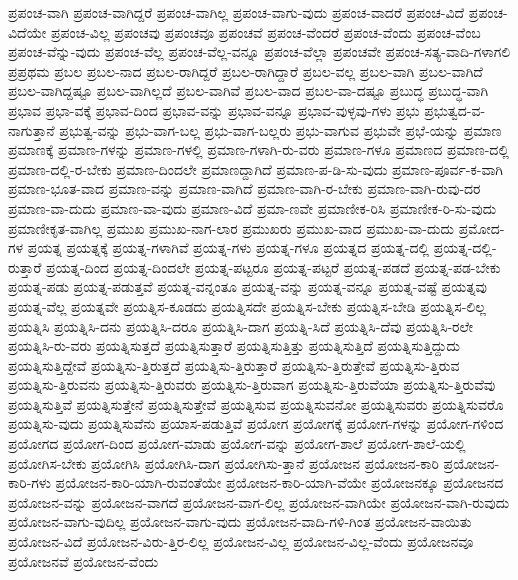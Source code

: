 {ಪ್ರಪಂಚ-ವಾಗಿ
ಪ್ರಪಂಚ-ವಾಗಿದ್ದರೆ
ಪ್ರಪಂಚ-ವಾಗಿಲ್ಲ
ಪ್ರಪಂಚ-ವಾಗು-ವುದು
ಪ್ರಪಂಚ-ವಾದರೆ
ಪ್ರಪಂಚ-ವಿದೆ
ಪ್ರಪಂಚ-ವಿದೆಯೇ
ಪ್ರಪಂಚ-ವಿಲ್ಲ
ಪ್ರಪಂಚವು
ಪ್ರಪಂಚವೂ
ಪ್ರಪಂಚವೆ
ಪ್ರಪಂಚ-ವೆಂದರೆ
ಪ್ರಪಂಚ-ವೆಂದು
ಪ್ರಪಂಚ-ವೆಂಬ
ಪ್ರಪಂಚ-ವೆನ್ನು-ವುದು
ಪ್ರಪಂಚ-ವೆಲ್ಲ
ಪ್ರಪಂಚ-ವೆಲ್ಲ-ವನ್ನೂ
ಪ್ರಪಂಚ-ವೆಲ್ಲಾ
ಪ್ರಪಂಚವೇ
ಪ್ರಪಂಚ-ಸತ್ಯ-ವಾದಿ-ಗಳಾಗಲಿ
ಪ್ರಪ್ರಥಮ
ಪ್ರಬಲ
ಪ್ರಬಲ-ನಾದ
ಪ್ರಬಲ-ರಾಗಿದ್ದರೆ
ಪ್ರಬಲ-ರಾಗಿದ್ದಾರೆ
ಪ್ರಬಲ-ವಲ್ಲ
ಪ್ರಬಲ-ವಾಗಿ
ಪ್ರಬಲ-ವಾಗಿದೆ
ಪ್ರಬಲ-ವಾಗಿದ್ದಷ್ಟೂ
ಪ್ರಬಲ-ವಾಗಿಲ್ಲದೆ
ಪ್ರಬಲ-ವಾಗಿವೆ
ಪ್ರಬಲ-ವಾದ
ಪ್ರಬಲ-ವಾ-ದಷ್ಟೂ
ಪ್ರಬುದ್ಧ
ಪ್ರಬುದ್ಧ-ವಾಗಿ
ಪ್ರಭಾವ
ಪ್ರಭಾ-ವಕ್ಕೆ
ಪ್ರಭಾವ-ದಿಂದ
ಪ್ರಭಾವ-ವನ್ನು
ಪ್ರಭಾವ-ವನ್ನೂ
ಪ್ರಭಾವ-ವುಳ್ಳವು-ಗಳು
ಪ್ರಭು
ಪ್ರಭುತ್ವದ-ವ-ನಾಗುತ್ತಾನೆ
ಪ್ರಭುತ್ವ-ವನ್ನು
ಪ್ರಭು-ವಾಗ-ಬಲ್ಲ
ಪ್ರಭು-ವಾಗ-ಬಲ್ಲರು
ಪ್ರಭು-ವಾಗುವ
ಪ್ರಭುವೇ
ಪ್ರಭೆ-ಯನ್ನು
ಪ್ರಮಾಣ
ಪ್ರಮಾಣಕ್ಕೆ
ಪ್ರಮಾಣ-ಗಳನ್ನು
ಪ್ರಮಾಣ-ಗಳಲ್ಲಿ
ಪ್ರಮಾಣ-ಗಳಾಗಿ-ರು-ವರು
ಪ್ರಮಾಣ-ಗಳೂ
ಪ್ರಮಾಣದ
ಪ್ರಮಾಣ-ದಲ್ಲಿ
ಪ್ರಮಾಣ-ದಲ್ಲಿ-ರ-ಬೇಕು
ಪ್ರಮಾಣ-ದಿಂದಲೇ
ಪ್ರಮಾಣದ್ದಾಗಿದೆ
ಪ್ರಮಾಣ-ಪ-ಡಿ-ಸು-ವುದು
ಪ್ರಮಾಣ-ಪೂರ್ವ-ಕ-ವಾಗಿ
ಪ್ರಮಾಣ-ಭೂತ-ವಾದ
ಪ್ರಮಾಣ-ವನ್ನು
ಪ್ರಮಾಣ-ವಾಗಿದೆ
ಪ್ರಮಾಣ-ವಾಗಿ-ರ-ಬೇಕು
ಪ್ರಮಾಣ-ವಾಗಿ-ರುವು-ದರ
ಪ್ರಮಾಣ-ವಾ-ದುದು
ಪ್ರಮಾಣ-ವಾ-ವುದು
ಪ್ರಮಾಣ-ವಿದೆ
ಪ್ರಮಾ-ಣವೇ
ಪ್ರಮಾಣೀಕ-ರಿಸಿ
ಪ್ರಮಾಣೀಕ-ರಿ-ಸು-ವುದು
ಪ್ರಮಾಣೀಕೃತ-ವಾಗಿಲ್ಲ
ಪ್ರಮುಖ
ಪ್ರಮುಖ-ನಾಗ-ಲಾರ
ಪ್ರಮುಖರು
ಪ್ರಮುಖ-ವಾದ
ಪ್ರಮುಖ-ವಾ-ದುದು
ಪ್ರಮೋದ-ಗಳ
ಪ್ರಯತ್ನ
ಪ್ರಯತ್ನಕ್ಕೆ
ಪ್ರಯತ್ನ-ಗಳಾಗಿವೆ
ಪ್ರಯತ್ನ-ಗಳು
ಪ್ರಯತ್ನ-ಗಳೂ
ಪ್ರಯತ್ನದ
ಪ್ರಯತ್ನ-ದಲ್ಲಿ
ಪ್ರಯತ್ನ-ದಲ್ಲಿ-ರುತ್ತಾರೆ
ಪ್ರಯತ್ನ-ದಿಂದ
ಪ್ರಯತ್ನ-ದಿಂದಲೇ
ಪ್ರಯತ್ನ-ಪಟ್ಟರೂ
ಪ್ರಯತ್ನ-ಪಟ್ಟರೆ
ಪ್ರಯತ್ನ-ಪಡದೆ
ಪ್ರಯತ್ನ-ಪಡ-ಬೇಕು
ಪ್ರಯತ್ನ-ಪಡು
ಪ್ರಯತ್ನ-ಪಡುತ್ತವೆ
ಪ್ರಯತ್ನ-ವನ್ನಂತೂ
ಪ್ರಯತ್ನ-ವನ್ನು
ಪ್ರಯತ್ನ-ವನ್ನೂ
ಪ್ರಯತ್ನ-ವಷ್ಟೆ
ಪ್ರಯತ್ನವು
ಪ್ರಯತ್ನ-ವೆಲ್ಲ
ಪ್ರಯತ್ನವೇ
ಪ್ರಯತ್ನಿಸ-ಕೂಡದು
ಪ್ರಯತ್ನಿಸದೇ
ಪ್ರಯತ್ನಿಸ-ಬೇಕು
ಪ್ರಯತ್ನಿಸ-ಬೇಡಿ
ಪ್ರಯತ್ನಿಸ-ಲಿಲ್ಲ
ಪ್ರಯತ್ನಿಸಿ
ಪ್ರಯತ್ನಿಸಿ-ದನು
ಪ್ರಯತ್ನಿಸಿ-ದರೂ
ಪ್ರಯತ್ನಿಸಿ-ದಾಗ
ಪ್ರಯತ್ನಿ-ಸಿದೆ
ಪ್ರಯತ್ನಿಸಿ-ದೆವು
ಪ್ರಯತ್ನಿಸಿ-ರಲೇ
ಪ್ರಯತ್ನಿಸಿ-ರು-ವರು
ಪ್ರಯತ್ನಿಸುತ್ತದೆ
ಪ್ರಯತ್ನಿಸುತ್ತಾರೆ
ಪ್ರಯತ್ನಿಸುತ್ತಿತ್ತು
ಪ್ರಯತ್ನಿಸುತ್ತಿದೆ
ಪ್ರಯತ್ನಿಸುತ್ತಿದ್ದುದು
ಪ್ರಯತ್ನಿಸುತ್ತಿದ್ದೇವೆ
ಪ್ರಯತ್ನಿಸು-ತ್ತಿರುತ್ತದೆ
ಪ್ರಯತ್ನಿಸು-ತ್ತಿರುತ್ತಾರೆ
ಪ್ರಯತ್ನಿಸು-ತ್ತಿರುತ್ತೇವೆ
ಪ್ರಯತ್ನಿಸು-ತ್ತಿರುವ
ಪ್ರಯತ್ನಿಸು-ತ್ತಿರುವನು
ಪ್ರಯತ್ನಿಸು-ತ್ತಿರುವರು
ಪ್ರಯತ್ನಿಸು-ತ್ತಿರುವಾಗ
ಪ್ರಯತ್ನಿಸು-ತ್ತಿರುವೆಯಾ
ಪ್ರಯತ್ನಿಸು-ತ್ತಿರುವೆವು
ಪ್ರಯತ್ನಿಸುತ್ತಿವೆ
ಪ್ರಯತ್ನಿಸುತ್ತೇನೆ
ಪ್ರಯತ್ನಿಸುತ್ತೇವೆ
ಪ್ರಯತ್ನಿಸುವ
ಪ್ರಯತ್ನಿಸುವನೋ
ಪ್ರಯತ್ನಿಸುವರು
ಪ್ರಯತ್ನಿಸುವರೊ
ಪ್ರಯತ್ನಿಸು-ವುದು
ಪ್ರಯತ್ನಿಸುವೆನು
ಪ್ರಯಾಸ-ಪಡುತ್ತಿವೆ
ಪ್ರಯೋಗ
ಪ್ರಯೋಗಕ್ಕೆ
ಪ್ರಯೋಗ-ಗಳನ್ನು
ಪ್ರಯೋಗ-ಗಳಿಂದ
ಪ್ರಯೋಗದ
ಪ್ರಯೋಗ-ದಿಂದ
ಪ್ರಯೋಗ-ಮಾಡು
ಪ್ರಯೋಗ-ವನ್ನು
ಪ್ರಯೋಗ-ಶಾಲೆ
ಪ್ರಯೋಗ-ಶಾಲೆ-ಯಲ್ಲಿ
ಪ್ರಯೋಗಿಸ-ಬೇಕು
ಪ್ರಯೋಗಿಸಿ
ಪ್ರಯೋಗಿಸಿ-ದಾಗ
ಪ್ರಯೋಗಿಸು-ತ್ತಾನೆ
ಪ್ರಯೋಜನ
ಪ್ರಯೋಜನ-ಕಾರಿ
ಪ್ರಯೋಜನ-ಕಾರಿ-ಗಳು
ಪ್ರಯೋಜನ-ಕಾರಿ-ಯಾಗಿ-ರುವಂತೆಯೇ
ಪ್ರಯೋಜನ-ಕಾರಿ-ಯಾಗಿ-ವೆಯೇ
ಪ್ರಯೋಜನಕ್ಕೂ
ಪ್ರಯೋಜನದ
ಪ್ರಯೋಜನ-ವನ್ನು
ಪ್ರಯೋಜನ-ವಾಗದೆ
ಪ್ರಯೋಜನ-ವಾಗ-ಲಿಲ್ಲ
ಪ್ರಯೋಜನ-ವಾಗಿಯೇ
ಪ್ರಯೋಜನ-ವಾಗಿ-ರುವುದು
ಪ್ರಯೋಜನ-ವಾಗು-ವುದಿಲ್ಲ
ಪ್ರಯೋಜನ-ವಾಗು-ವುದು
ಪ್ರಯೋಜನ-ವಾದಿ-ಗಳಿ-ಗಿಂತ
ಪ್ರಯೋಜನ-ವಾಯಿತು
ಪ್ರಯೋಜನ-ವಿದೆ
ಪ್ರಯೋಜನ-ವಿರು-ತ್ತಿರ-ಲಿಲ್ಲ
ಪ್ರಯೋಜನ-ವಿಲ್ಲ
ಪ್ರಯೋಜನ-ವಿಲ್ಲ-ವೆಂದು
ಪ್ರಯೋಜನವೂ
ಪ್ರಯೋಜನವೆ
ಪ್ರಯೋಜನ-ವೆಂದು
}
